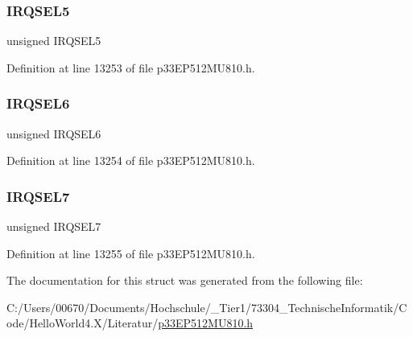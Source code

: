 \subsubsection{\texorpdfstring{I\+R\+Q\+S\+E\+L5}{IRQSEL5}}
{\footnotesize\ttfamily unsigned I\+R\+Q\+S\+E\+L5}



Definition at line 13253 of file p33\+E\+P512\+M\+U810.\+h.

\mbox{\label{structtag_d_m_a8_r_e_q_b_i_t_s_ace52408ef8c29561f3c56a3fbcbc8217}} 
\subsubsection{\texorpdfstring{I\+R\+Q\+S\+E\+L6}{IRQSEL6}}
{\footnotesize\ttfamily unsigned I\+R\+Q\+S\+E\+L6}



Definition at line 13254 of file p33\+E\+P512\+M\+U810.\+h.

\mbox{\label{structtag_d_m_a8_r_e_q_b_i_t_s_acce7dedecdf1f53cdbead3edf7c5d53a}} 
\subsubsection{\texorpdfstring{I\+R\+Q\+S\+E\+L7}{IRQSEL7}}
{\footnotesize\ttfamily unsigned I\+R\+Q\+S\+E\+L7}



Definition at line 13255 of file p33\+E\+P512\+M\+U810.\+h.



The documentation for this struct was generated from the following file\+:\begin{DoxyCompactItemize}
\item 
C\+:/\+Users/00670/\+Documents/\+Hochschule/\+\_\+\+Tier1/73304\+\_\+\+Technische\+Informatik/\+Code/\+Hello\+World4.\+X/\+Literatur/\hyperlink{p33_e_p512_m_u810_8h}{p33\+E\+P512\+M\+U810.\+h}\end{DoxyCompactItemize}
